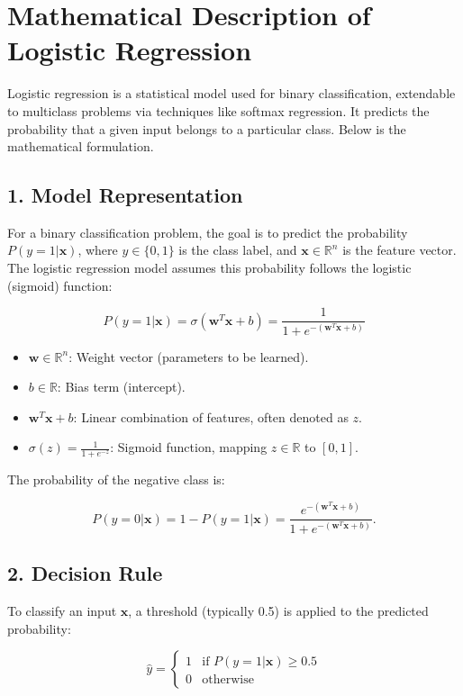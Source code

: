 \documentclass[a4paper,12pt]{article}
\begin{document}
\section*{Mathematical Description of Logistic Regression}

Logistic regression is a statistical model used for binary classification, extendable to multiclass problems via techniques like softmax regression. It predicts the probability that a given input belongs to a particular class. Below is the mathematical formulation.

\subsection*{1. Model Representation}
For a binary classification problem, the goal is to predict the probability $P(y=1 | \mathbf{x})$, where $y \in \{0, 1\}$ is the class label, and $\mathbf{x} \in \mathbb{R}^n$ is the feature vector. The logistic regression model assumes this probability follows the logistic (sigmoid) function:

\[
P(y=1 | \mathbf{x}) = \sigma(\mathbf{w}^T \mathbf{x} + b) = \frac{1}{1 + e^{-(\mathbf{w}^T \mathbf{x} + b)}}
\]

\begin{itemize}
    \item $\mathbf{w} \in \mathbb{R}^n$: Weight vector (parameters to be learned).
    \item $b \in \mathbb{R}$: Bias term (intercept).
    \item $\mathbf{w}^T \mathbf{x} + b$: Linear combination of features, often denoted as $z$.
    \item $\sigma(z) = \frac{1}{1 + e^{-z}}$: Sigmoid function, mapping $z \in \mathbb{R}$ to $[0, 1]$.
\end{itemize}

The probability of the negative class is:

\[
P(y=0 | \mathbf{x}) = 1 - P(y=1 | \mathbf{x}) = \frac{e^{-(\mathbf{w}^T \mathbf{x} + b)}}{1 + e^{-(\mathbf{w}^T \mathbf{x} + b)}}.
\]

\subsection*{2. Decision Rule}
To classify an input $\mathbf{x}$, a threshold (typically 0.5) is applied to the predicted probability:

\[
\hat{y} =
\begin{cases} 
1 & \text{if } P(y=1 | \mathbf{x}) \geq 0.5 \\
0 & \text{otherwise}
\end{cases}
\]
\end{document}
